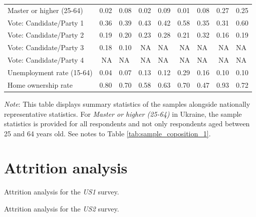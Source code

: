 \begin{table}[h!]
{{\begin{tabular}[t]{lrlrlrlrl}
    \addlinespace
    Master or higher (25-64) & 0.02 & 0.08 & 0.02 & 0.09 & 0.01 & 0.08 & 0.27 & 0.25\\
    \addlinespace
    Vote: Candidate/Party 1 & 0.36 & 0.39 & 0.43 & 0.42 & 0.58 & 0.35 & 0.31 & 0.60\\
    Vote: Candidate/Party 2 & 0.19 & 0.20 & 0.23 & 0.28 & 0.21 & 0.32 & 0.16 & 0.19\\
    Vote: Candidate/Party 3 & 0.18 & 0.10 & NA & NA & NA & NA & NA & NA\\
    Vote: Candidate/Party 4 & NA & NA & NA & NA & NA & NA & NA & NA\\
    \addlinespace
    Unemployment rate (15-64) & 0.04 & 0.07 & 0.13 & 0.12 & 0.29 & 0.16 & 0.10 & 0.10\\
    \addlinespace
    Home ownership rate & 0.80 & 0.70 & 0.58 & 0.63 & 0.70 & 0.47 & 0.93 & 0.72\\
    \bottomrule
    \end{tabular}
            }
        } \label{tab:sample_composition_5}
        {\footnotesize \textit{Note}: This table displays summary statistics of the samples alongside nationally representative statistics. For \textit{Master or higher (25-64)} in Ukraine, the sample statistics is provided for all respondents and not only respondents aged between 25 and 64 years old. See notes to Table \ref{tab:sample_coposition_1}. }
    \end{table}

\clearpage
\section{Attrition analysis}\label{app:attrition}

\begin{table}[h]\label{tab:attrition_US1}
    \cprotect\caption[Attrition analysis: \textit{US1}]{Attrition analysis for the \textit{US1} survey.} 
    \makebox[\textwidth][c]{
\resizebox*{!}{.73\textheight}{ %
        
        }
    }
    {\footnotesize %
    }
\end{table}

\begin{table}[h]\label{tab:attrition_US2}
    \cprotect\caption[Attrition analysis: \textit{US2}]{Attrition analysis for the \textit{US2} survey.} 
    \makebox[\textwidth][c]{
\resizebox*{!}{.73\textheight}{ %
        
        }
    }
    {\footnotesize %
    }
\end{table}

